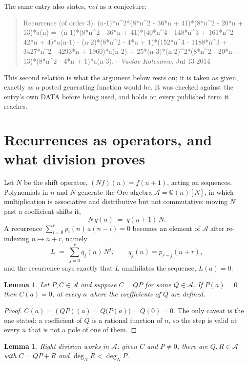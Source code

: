 \documentclass[11pt,a4paper]{article}
\theoremstyle{plain}
\newtheorem{lemma}[theorem]{Lemma}
\theoremstyle{definition}
\begin{document}
The same entry also states, \emph{not} as a conjecture:
\begin{quote}\small
Recurrence (of order 3): (n-1)*n\textasciicircum{}2*(8*n\textasciicircum{}2 - 36*n + 41)*(8*n\textasciicircum{}2 - 20*n + 13)*a(n) =  -(n-1)*(8*n\textasciicircum{}2 - 36*n + 41)*(40*n\textasciicircum{}4 - 148*n\textasciicircum{}3 + 161*n\textasciicircum{}2 - 42*n + 4)*a(n-1) - (n-2)*(8*n\textasciicircum{}2 - 4*n + 1)*(152*n\textasciicircum{}4 - 1188*n\textasciicircum{}3 + 3427*n\textasciicircum{}2 - 4293*n + 1960)*a(n-2) + 25*(n-3)*(n-2)\textasciicircum{}2*(8*n\textasciicircum{}2 - 20*n + 13)*(8*n\textasciicircum{}2 - 4*n + 1)*a(n-3). - \emph{Vaclav Kotesovec}, Jul 13 2014
\end{quote}
This second relation is what the argument below rests on; it is taken as given, exactly as
a posted generating function would be. It was checked against the entry's own DATA before
being used, and holds on every published term it reaches.

\section{Recurrences as operators, and what division proves}

Let $N$ be the shift operator, $(Nf)(n)=f(n+1)$, acting on sequences. Polynomials in $n$
and $N$ generate the Ore algebra $\mathcal{A}=\mathbb{Q}(n)[N]$, in which multiplication is
associative and distributive but not commutative: moving $N$ past a coefficient shifts it,
\[
N\,q(n)\;=\;q(n+1)\,N .
\]
A recurrence $\sum_{i=0}^{r}p_{i}(n)\,a(n-i)=0$ becomes an element of $\mathcal{A}$ after
re-indexing $n\mapsto n+r$, namely
\[
L\;=\;\sum_{j=0}^{r}q_{j}(n)\,N^{j},\qquad q_{j}(n)=p_{r-j}(n+r),
\]
and the recurrence says exactly that $L$ annihilates the sequence, $L(a)=0$.

\begin{lemma}\label{lem:factor}
Let $P,C\in\mathcal{A}$ and suppose $C=QP$ for some $Q\in\mathcal{A}$. If $P(a)=0$ then
$C(a)=0$, at every $n$ where the coefficients of $Q$ are defined.
\end{lemma}

\begin{proof}
$C(a)=(QP)(a)=Q\bigl(P(a)\bigr)=Q(0)=0$. The only caveat is the one stated: a coefficient
of $Q$ is a rational function of $n$, so the step is valid at every $n$ that is not a pole
of one of them.
\end{proof}

\begin{lemma}\label{lem:div}
Right division works in $\mathcal{A}$: given $C$ and $P\neq0$, there are $Q,R\in\mathcal{A}$
with $C=QP+R$ and $\deg_{N}R<\deg_{N}P$.
\end{lemma}
\end{document}
